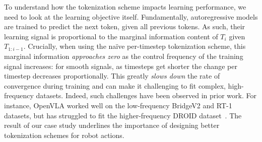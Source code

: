 To understand how the tokenization scheme impacts learning performance, we need to look at the learning objective itself. Fundamentally, autoregressive models are trained to predict the next token, given all previous tokens. As such, their learning signal is proportional to the marginal information content of $T_i$ given $T_{1:i-1}$. Crucially, when using the na\"{i}ve per-timestep tokenization scheme, this marginal information \emph{approaches zero} as the control frequency of the training signal increases: for smooth signals, as timesteps get shorter the change per timestep decreases proportionally.
This greatly \emph{slows down} the rate of convergence during training and can make it challenging to fit complex, high-frequency datasets. Indeed, such challenges have been observed in prior work. For instance, OpenVLA worked well on the low-frequency BridgeV2 and RT-1 datasets, but has struggled to fit the higher-frequency DROID dataset~\citep{kim2024openvla}. The result of our case study underlines the importance of designing better tokenization schemes for robot actions.

